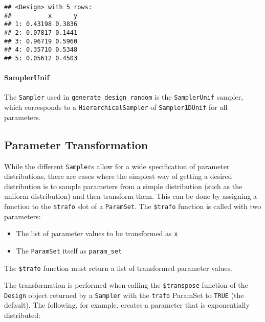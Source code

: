 \documentclass[
]{scrbook}
\providecommand{\tightlist}{%
  \setlength{\itemsep}{0pt}\setlength{\parskip}{0pt}}
\begin{document}
\begin{verbatim}
## <Design> with 5 rows:
##          x      y
## 1: 0.43198 0.3836
## 2: 0.07817 0.1441
## 3: 0.96719 0.5960
## 4: 0.35710 0.5348
## 5: 0.05612 0.4503
\end{verbatim}

\hypertarget{samplerunif}{%
\paragraph{SamplerUnif}\label{samplerunif}}

The \texttt{Sampler} used in \texttt{generate\_design\_random} is the \texttt{SamplerUnif} sampler, which corresponds to a \texttt{HierarchicalSampler} of \texttt{Sampler1DUnif} for all parameters.

\hypertarget{parameter-transformation}{%
\subsection{Parameter Transformation}\label{parameter-transformation}}

While the different \texttt{Sampler}s allow for a wide specification of parameter distributions, there are cases where the simplest way of getting a desired distribution is to sample parameters from a simple distribution (such as the uniform distribution) and then transform them.
This can be done by assigning a function to the \texttt{\$trafo} slot of a \texttt{ParamSet}.
The \texttt{\$trafo} function is called with two parameters:

\begin{itemize}
\tightlist
\item
  The list of parameter values to be transformed as \texttt{x}
\item
  The \texttt{ParamSet} itself as \texttt{param\_set}
\end{itemize}

The \texttt{\$trafo} function must return a list of transformed parameter values.

The transformation is performed when calling the \texttt{\$transpose} function of the \texttt{Design} object returned by a \texttt{Sampler} with the \texttt{trafo} ParamSet to \texttt{TRUE} (the default).
The following, for example, creates a parameter that is exponentially distributed:
\end{document}
